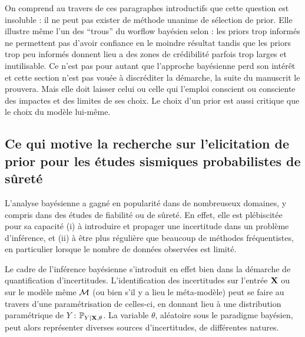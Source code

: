 On comprend au travers de ces paragraphes introductifs que cette question est insoluble : il ne peut pas exister de méthode unanime de sélection de prior. Elle illustre même l'un des ``trous'' du worflow bayésien selon \citet{gelman_holes_2020} : les priors trop informés ne permettent pas d'avoir confiance en le moindre résultat tandis que les priors trop peu informés %
donnent lieu a des zones de crédibilité parfois trop larges et inutilisable.
Ce n'est pas pour autant que l'approche bayésienne perd son intérêt et cette section n'est pas vouée à discréditer la démarche, la suite du manuscrit le prouvera. %
Mais elle doit laisser celui ou celle qui l'emploi conscient ou consciente des impactes et des limites de ses choix. Le choix d'un prior est aussi critique que le choix du modèle lui-même.














\subsection{Ce qui motive la recherche sur l'elicitation de prior pour les études sismiques probabilistes de sûreté}

L'analyse bayésienne a gagné en popularité dans de nombreuseux domaines, y compris dans des études de fiabilité ou de sûreté. 
En effet, elle est plébiscitée pour sa capacité (i) à introduire et propager une incertitude dans un problème d'inférence, et (ii) à être plus régulière que beaucoup de méthodes fréquentistes, en particulier lorsque le nombre de données observées est limité.

Le cadre de l'inférence bayésienne s'introduit en effet bien dans la démarche de quantification d'incertitudes. 
L'identification des incertitudes sur l'entrée $\mathbf{X}$ ou sur le modèle même $\mathcal{M}$ (ou bien s'il y a lieu le méta-modèle) peut se faire au travers d'une paramétrisation de celles-ci, en donnant lieu à une distribution paramétrique de $Y$ : $\mathbb{P}_{Y|\mathbf{X},\theta}$. La variable $\theta$, aléatoire sous le paradigme bayésien, peut alors représenter diverses sources d'incertitudes, de différentes natures.


